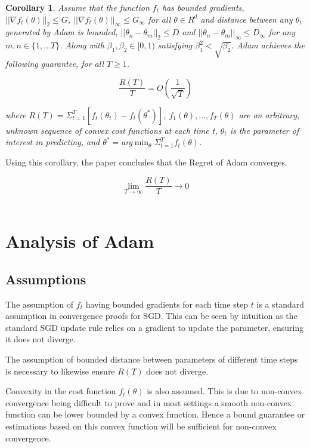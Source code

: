 \documentclass[nohyperref]{article}
\theoremstyle{plain}
\newtheorem{corollary}[theorem]{Corollary}
\theoremstyle{definition}
\theoremstyle{remark}
\begin{document}
\begin{corollary}
Assume that the function $f_t$ has bounded gradients, $||\nabla f_t(\theta)||_2 \leq G$, $||\nabla f_t(\theta)||_\infty \leq G_\infty$ for all $\theta\in R^d$ and distance between any $\theta_t$ generated by Adam is bounded, $||\theta_n-\theta_m||_2 \leq D$ and $||\theta_n-\theta_m||_\infty \leq D_\infty$ for any $m, n \in \{1,...T\}$. Along with $\beta_{1}, \beta_{2} \in [0,1)$ satisfying $\beta_{1}^{2} < \sqrt{\beta_{2}}$. Adam achieves the following guarantee, for all $T \geq 1$.

$$\frac{R(T)}{T} = O(\frac{1}{\sqrt{T}})$$

where $R(T) = \Sigma^T_{t=1}[f_t(\theta_t)-f_t(\theta^*)]$, $f_1(\theta),...,f_T(\theta)$ are an arbitrary, unknown sequence of convex cost functions at each time t, $\theta_t$ is the parameter of interest in predicting, and $\theta^*=$arg$\min_{\theta}\Sigma^T_{t=1}f_t(\theta)$.
\end{corollary}

Using this corollary, the paper concludes that the Regret of Adam converges.

$$\lim_{T\rightarrow\infty}\frac{R(T)}{T} \to 0$$\\

\section{Analysis of Adam}
\subsection{Assumptions}
The assumption of $f_t$ having bounded gradients for each time step $t$ is a standard assumption in convergence proofs for SGD. This can be seen by intuition as the standard SGD update rule relies on a gradient to update the parameter, ensuring it does not diverge.

The assumption of bounded distance between parameters of different time steps is necessary to likewise ensure $R(T)$ does not diverge.

Convexity in the cost function $f_t(\theta)$ is also assumed. This is due to non-convex convergence being difficult to prove and in most settings a smooth non-convex function can be lower bounded by a convex function. Hence a bound guarantee or estimations based on this convex function will be sufficient for non-convex convergence. 
\end{document}

